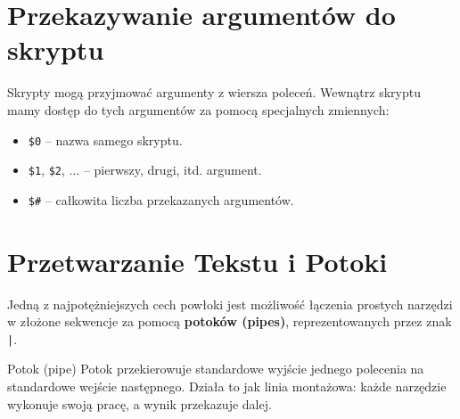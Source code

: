 \section{Przekazywanie argumentów do skryptu}
Skrypty mogą przyjmować argumenty z wiersza poleceń. Wewnątrz skryptu mamy dostęp do tych argumentów za pomocą specjalnych zmiennych:
\begin{itemize}
    \item \texttt{\$0} – nazwa samego skryptu.
    \item \texttt{\$1}, \texttt{\$2}, ... – pierwszy, drugi, itd. argument.
    \item \texttt{\$\#} – całkowita liczba przekazanych argumentów.
\end{itemize}

\section{Przetwarzanie Tekstu i Potoki}
Jedną z najpotężniejszych cech powłoki jest możliwość łączenia prostych narzędzi w złożone sekwencje za pomocą \textbf{potoków (pipes)}, reprezentowanych przez znak \texttt{|}.

\begin{definitionbox}{Potok (pipe)}
Potok przekierowuje standardowe wyjście jednego polecenia na standardowe wejście następnego. Działa to jak linia montażowa: każde narzędzie wykonuje swoją pracę, a wynik przekazuje dalej.
\end{definitionbox}

